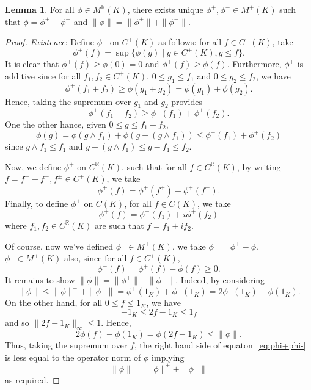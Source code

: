 \documentclass[]{article}
\theoremstyle{definition}
\newtheorem{lemma}{Lemma}[section]
\begin{document}
\begin{lemma}
  For all \(\phi \in M^\mathbb{R}(K)\), there exists unique \(\phi^+, \phi^- \in M^+(K)\) such that 
  \(\phi = \phi^+ - \phi^-\) and \(\|\phi\| = \|\phi^+\| + \|\phi^-\|\).
\end{lemma}
\begin{proof}
  \textit{Existence}: Define \(\phi^+\) on \(C^+(K)\) as follows: for all \(f \in C^+(K)\), take 
  \[\phi^+(f) = \sup\{\phi(g) \mid g \in C^+(K), g \le f\}.\]
  It is clear that \(\phi^+(f) \ge \phi(0) = 0\) and \(\phi^+(f) \ge \phi(f)\). Furthermore, 
  \(\phi^+\) is additive since for all \(f_1, f_2 \in C^+(K)\), \(0 \le g_1 \le f_1\) and 
  \(0 \le g_2 \le f_2\), we have 
  \[\phi^+(f_1 + f_2) \ge \phi(g_1 + g_2) = \phi(g_1) + \phi(g_2).\]
  Hence, taking the supremum over \(g_1\) and \(g_2\) provides 
  \[\phi^+(f_1 + f_2) \ge \phi^+(f_1) + \phi^+(f_2).\]
  One the other hance, given \(0 \le g \le f_1 + f_2\),  
  \[\phi(g) = \phi(g \wedge f_1) + \phi(g - (g \wedge f_1)) \le \phi^+(f_1) + \phi^+(f_2)\]
  since \(g \wedge f_1 \le f_1\) and \(g - (g \wedge f_1) \le g - f_1 \le f_2\). 

  Now, we define \(\phi^+\) on \(C^\mathbb{R}(K)\). such that for all \(f \in C^\mathbb{R}(K)\), by
  writing \(f = f^+ - f^-, f^\pm \in C^+(K)\), we take 
  \[\phi^+(f) = \phi^+(f^+) - \phi^+(f^-).\]
  Finally, to define \(\phi^+\) on \(C(K)\), for all \(f \in C(K)\), we take 
  \[\phi^+(f) = \phi^+(f_1) + i\phi^+(f_2)\]
  where \(f_1, f_2 \in C^\mathbb{R}(K)\) are such that \(f = f_1 + if_2\).

  Of course, now we've defined \(\phi^+ \in M^+(K)\), we take \(\phi^- = \phi^+ - \phi\). 
  \(\phi^- \in M^+(K)\) also, since for all \(f \in C^+(K)\), 
  \[\phi^-(f) = \phi^+(f) - \phi(f) \ge 0.\]
  It remains to show \(\|\phi\| = \|\phi^+\| + \|\phi^-\|\). Indeed, by considering
  \begin{equation}\label{eq:phi+phi-}
    \|\phi\| \le \|\phi\|^+ + \|\phi^-\| = \phi^+(1_K) + \phi^-(1_K) = 2\phi^+(1_K) - \phi(1_K).
  \end{equation}
  On the other hand, for all \(0 \le f \le 1_K\), we have 
  \[-1_K \le 2f - 1_K \le 1_f\]
  and so \(\|2f - 1_K\|_\infty \le 1\). Hence, 
  \[2\phi(f) - \phi(1_K) = \phi(2f - 1_K) \le \|\phi\|.\]
  Thus, taking the supremum over \(f\), the right hand side of equaton~\eqref{eq:phi+phi-} is less 
  equal to the operator norm of \(\phi\) implying 
  \[\|\phi\| = \|\phi\|^+ + \|\phi^-\|\]
  as required.


\end{proof}
\end{document}
